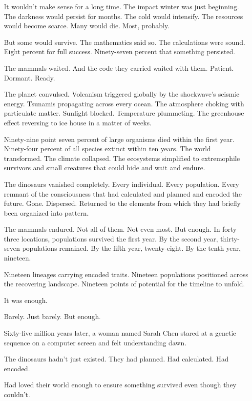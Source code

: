 It wouldn't make sense for a long time. The impact winter was just beginning. The darkness would persist for months. The cold would intensify. The resources would become scarce. Many would die. Most, probably.

But some would survive. The mathematics said so. The calculations were sound. Eight percent for full success. Ninety-seven percent that something persisted.

The mammals waited. And the code they carried waited with them. Patient. Dormant. Ready.

\scenebreak

The planet convulsed. Volcanism triggered globally by the shockwave's seismic energy. Tsunamis propagating across every ocean. The atmosphere choking with particulate matter. Sunlight blocked. Temperature plummeting. The greenhouse effect reversing to ice house in a matter of weeks.

Ninety-nine point seven percent of large organisms died within the first year. Ninety-four percent of all species extinct within ten years. The world transformed. The climate collapsed. The ecosystems simplified to extremophile survivors and small creatures that could hide and wait and endure.

The dinosaurs vanished completely. Every individual. Every population. Every remnant of the consciousness that had calculated and planned and encoded the future. Gone. Dispersed. Returned to the elements from which they had briefly been organized into pattern.

The mammals endured. Not all of them. Not even most. But enough. In forty-three locations, populations survived the first year. By the second year, thirty-seven populations remained. By the fifth year, twenty-eight. By the tenth year, nineteen.

Nineteen lineages carrying encoded traits. Nineteen populations positioned across the recovering landscape. Nineteen points of potential for the timeline to unfold.

It was enough.

Barely. Just barely. But enough.

\scenebreak

Sixty-five million years later, a woman named Sarah Chen stared at a genetic sequence on a computer screen and felt understanding dawn.

The dinosaurs hadn't just existed. They had planned. Had calculated. Had encoded.

Had loved their world enough to ensure something survived even though they couldn't.

